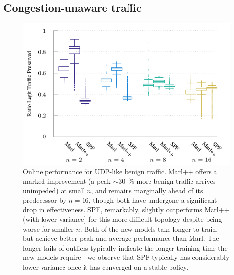 \documentclass[conference, letterpaper, 10pt, times]{IEEEtran}
\begin{document}
\subsection{Congestion-unaware traffic}
%	
%	
\begin{figure}
	\centering
	\includegraphics[width=0.95\linewidth]{../plots/udp-box}
	
	\caption{
		Online performance for UDP-like benign traffic.
		Marl++ offers a marked improvement (a peak $\sim$\SI{30}{\percent} more benign traffic arrives unimpeded) at small $n$, and remains marginally ahead of its predecessor by $n=16$, though both have undergone a significant drop in effectiveness.
		SPF, remarkably, slightly outperforms Marl++ (with lower variance) for this more difficult topology despite being worse for smaller $n$.
		Both of the new models take longer to train, but achieve better peak and average performance than Marl.
		The longer tails of outliers typically indicate the longer training time the new models require---we observe that SPF typically has considerably lower variance once it has converged on a stable policy.
		\label{fig:udp-box}
	}
\end{figure}
\end{document}
